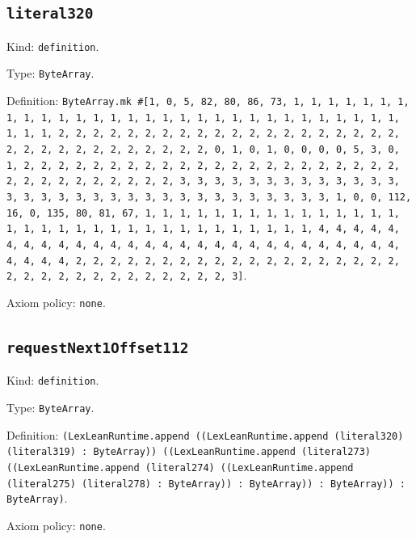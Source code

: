 \documentclass[11pt]{article}
\begin{document}
\subsection*{\texttt{literal320}}
\noindent Kind: \texttt{definition}.\par
\noindent Type: \texttt{ByteArray}.\par
\noindent Definition: \texttt{ByteArray.mk \#[1, 0, 5, 82, 80, 86, 73, 1, 1, 1, 1, 1, 1, 1, 1, 1, 1, 1, 1, 1, 1, 1, 1, 1, 1, 1, 1, 1, 1, 1, 1, 1, 1, 1, 1, 1, 1, 1, 1, 1, 2, 2, 2, 2, 2, 2, 2, 2, 2, 2, 2, 2, 2, 2, 2, 2, 2, 2, 2, 2, 2, 2, 2, 2, 2, 2, 2, 2, 2, 2, 2, 2, 0, 1, 0, 1, 0, 0, 0, 0, 5, 3, 0, 1, 2, 2, 2, 2, 2, 2, 2, 2, 2, 2, 2, 2, 2, 2, 2, 2, 2, 2, 2, 2, 2, 2, 2, 2, 2, 2, 2, 2, 2, 2, 2, 2, 3, 3, 3, 3, 3, 3, 3, 3, 3, 3, 3, 3, 3, 3, 3, 3, 3, 3, 3, 3, 3, 3, 3, 3, 3, 3, 3, 3, 3, 3, 3, 3, 1, 0, 0, 112, 16, 0, 135, 80, 81, 67, 1, 1, 1, 1, 1, 1, 1, 1, 1, 1, 1, 1, 1, 1, 1, 1, 1, 1, 1, 1, 1, 1, 1, 1, 1, 1, 1, 1, 1, 1, 1, 1, 1, 4, 4, 4, 4, 4, 4, 4, 4, 4, 4, 4, 4, 4, 4, 4, 4, 4, 4, 4, 4, 4, 4, 4, 4, 4, 4, 4, 4, 4, 4, 4, 4, 2, 2, 2, 2, 2, 2, 2, 2, 2, 2, 2, 2, 2, 2, 2, 2, 2, 2, 2, 2, 2, 2, 2, 2, 2, 2, 2, 2, 2, 2, 2, 2, 3]}.\par
\noindent Axiom policy: \texttt{none}.\par
\subsection*{\texttt{requestNext1Offset112}}
\noindent Kind: \texttt{definition}.\par
\noindent Type: \texttt{ByteArray}.\par
\noindent Definition: \texttt{(LexLeanRuntime.append ((LexLeanRuntime.append (literal320) (literal319) : ByteArray)) ((LexLeanRuntime.append (literal273) ((LexLeanRuntime.append (literal274) ((LexLeanRuntime.append (literal275) (literal278) : ByteArray)) : ByteArray)) : ByteArray)) : ByteArray)}.\par
\noindent Axiom policy: \texttt{none}.\par
\end{document}
